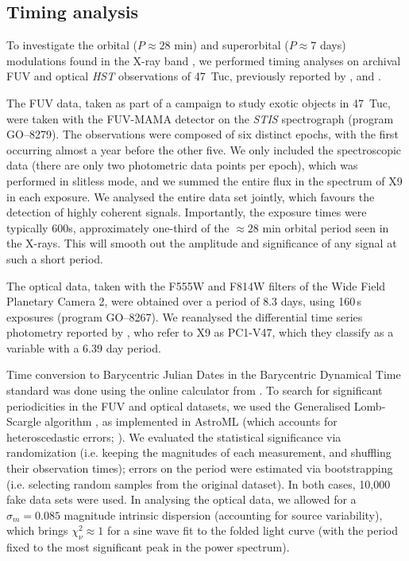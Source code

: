 \documentclass[a4paper,fleqn,usenatbib]{mnras}
\begin{document}
\subsection{Timing analysis}

To investigate the orbital ($P \approx 28$ min) and superorbital ($P \approx 7$ days) modulations found in the X-ray band \citep{2017MNRAS.467.2199B}, we performed timing analyses on archival FUV and optical {\it HST} observations of 47~Tuc, previously reported by \citet{2008ApJ...683.1006K}, \citet{2000ApJ...545L..47G} and \citet{2001ApJ...559.1060A}. 

The FUV data, taken as part of a campaign to study exotic objects in 47~Tuc, were taken with the FUV-MAMA detector on the {\it STIS} spectrograph (program GO--8279). The observations were composed of six distinct epochs, with the first occurring almost a year before the other five. We only included the spectroscopic data (there are only two photometric data points per epoch), which was performed in slitless mode, and we summed the entire flux in the spectrum of X9 in each exposure. We analysed the entire data set jointly, which favours the detection of highly coherent signals. Importantly, the exposure times were typically 600s, approximately one-third of the $\approx 28$ min orbital period seen in the X-rays. This will smooth out the amplitude and significance of any signal at such a short period.

The optical data, taken with the F555W and F814W filters of the Wide Field Planetary Camera 2, were obtained over a period of 8.3 days, using 160\,s exposures (program GO--8267). We reanalysed the differential time series photometry reported by \citet{2001ApJ...559.1060A}, who refer to X9 as PC1-V47, which they classify as a variable with a 6.39 day period.

Time conversion to Barycentric Julian Dates in the Barycentric Dynamical Time standard was done using the online calculator from \citet{2010PASP..122..935E}. To search for significant periodicities in the FUV and optical datasets, we used the Generalised Lomb-Scargle algorithm \citep{2009A&A...496..577Z}, as implemented in AstroML (which accounts for heteroscedastic errors; \citealp{astroML}). We evaluated the statistical significance via randomization (i.e. keeping the magnitudes of each measurement, and shuffling their observation times); errors on the period were estimated via bootstrapping (i.e. selecting random samples from the original dataset). In both cases, 10,000 fake data sets were used. In analysing the optical data, we allowed for a $\sigma_m = 0.085$ magnitude intrinsic dispersion (accounting for source variability), which brings $\chi^2_\nu \approx 1$ for a sine wave fit to the folded light curve (with the period fixed to the most significant peak in the power spectrum).
\end{document}

